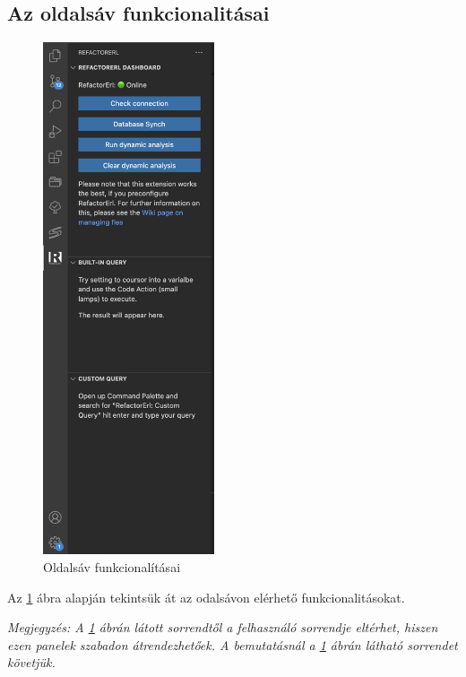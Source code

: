 \newpage

\subsection{Az oldalsáv funkcionalitásai}

\begin{figure}
\centering
\includegraphics[width=0.45\textwidth]{images/sidebar_active.png}
\caption{\label{fig:sidebar_active} Oldalsáv funkcionalításai}
\end{figure}

Az \ref{fig:sidebar_active} ábra alapján tekintsük át az odalsávon elérhető funkcionalitásokat. 

\textit{Megjegyzés: A \ref{fig:sidebar_active} ábrán látott sorrendtől a felhasználó sorrendje eltérhet, hiszen ezen panelek szabadon átrendezhetőek. A bemutatásnál a \ref{fig:sidebar_active} ábrán látható sorrendet követjük.}

